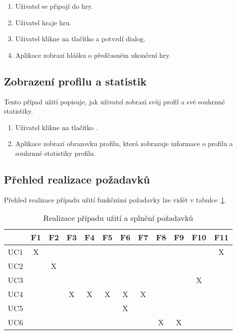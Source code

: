 \begin{enumerate}
    \item Uživatel se připojí do hry.
    \item Uživatel hraje hru.
    \item Uživatel klikne na tlačítko 
    a potvrdí dialog.
    \item Aplikace zobrazí hlášku o předčasném ukončení hry.
\end{enumerate}

\subsection{Zobrazení profilu a statistik}

Tento případ užití popisuje,
jak uživatel zobrazí svůj profil a své souhrnné statistiky.

\begin{enumerate}
    \item Uživatel klikne na tlačítko .
    \item Aplikace zobrazí obrazovku profilu,
    která zobrazuje informace o profilu a souhrnné statistiky profilu.
\end{enumerate}

\let\thesubsection=\oldsubsection

\subsection{Přehled realizace požadavků}

Přehled realizace případu užití funkčními požadavky lze vidět v
tabulce~\ref{tab:use-case-requirements}.

\begin{table}[h!]
    \centering
    \begin{tabular}{c||c|c|c|c|c|c|c|c|c|c|c} 
        & F1 & F2 & F3 & F4 & F5 & F6 & F7 & F8 & F9 & F10 & F11 \\\hline\hline
        UC1 & X &   &   &   &   &   &   &   &   &   & X \\\hline %
        UC2 &   & X &   &   &   &   &   &   &   &   &   \\\hline %
        UC3 &   &   &   &   &   &   &   &   &   & X &   \\\hline %
        UC4 &   &   & X & X & X & X & X &   &   &   &   \\\hline %
        UC5 &   &   &   &   &   & X &   &   &   &   &   \\\hline %
        UC6 &   &   &   &   &   &   &   & X & X &   &   \\ %
    \end{tabular}
    \caption{Realizace případu užití a splnění požadavků}
    \label{tab:use-case-requirements}
\end{table}
